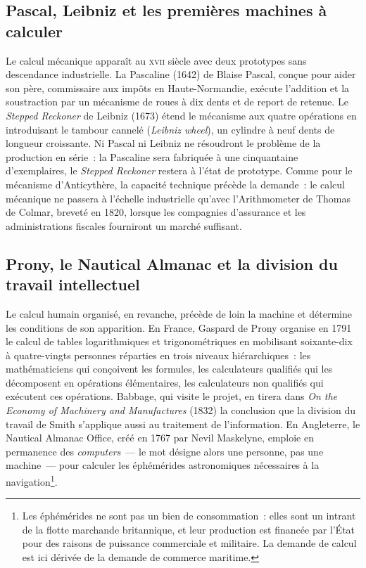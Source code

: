 \subsection{Pascal, Leibniz et les premières machines à calculer}\label{subsec:pascaline}

Le calcul mécanique apparaît au \textsc{xvii}\ieme{} siècle avec deux prototypes sans descendance industrielle. La Pascaline (1642) de Blaise Pascal, conçue pour aider son père, commissaire aux impôts en Haute-Normandie, exécute l'addition et la soustraction par un mécanisme de roues à dix dents et de report de retenue. Le \emph{Stepped Reckoner} de Leibniz (1673) étend le mécanisme aux quatre opérations en introduisant le tambour cannelé (\emph{Leibniz wheel}), un cylindre à neuf dents de longueur croissante. Ni Pascal ni Leibniz ne résoudront le problème de la production en série~: la Pascaline sera fabriquée à une cinquantaine d'exemplaires, le \emph{Stepped Reckoner} restera à l'état de prototype. %
Comme pour le mécanisme d'Anticythère, la capacité technique précède la demande~: le calcul mécanique ne passera à l'échelle industrielle qu'avec l'Arithmometer de Thomas de Colmar, breveté en 1820, lorsque les compagnies d'assurance et les administrations fiscales fourniront un marché suffisant.

\subsection{Prony, le Nautical Almanac et la division du travail intellectuel}\label{subsec:prony}

Le calcul humain organisé, en revanche, précède de loin la machine et détermine les conditions de son apparition. En France, Gaspard de Prony organise en 1791 le calcul de tables logarithmiques et trigonométriques en mobilisant soixante-dix à quatre-vingts personnes réparties en trois niveaux hiérarchiques~: les mathématiciens qui conçoivent les formules, les calculateurs qualifiés qui les décomposent en opérations élémentaires, les calculateurs non qualifiés qui exécutent ces opérations. %
Babbage, qui visite le projet, en tirera dans \emph{On the Economy of Machinery and Manufactures} (1832) la conclusion que la division du travail de Smith s'applique aussi au traitement de l'information. En Angleterre, le Nautical Almanac Office, créé en 1767 par Nevil Maskelyne, emploie en permanence des \emph{computers}~--- le mot désigne alors une personne, pas une machine~--- pour calculer les éphémérides astronomiques nécessaires à la navigation\footnote{Les éphémérides ne sont pas un bien de consommation~: elles sont un intrant de la flotte marchande britannique, et leur production est financée par l'État pour des raisons de puissance commerciale et militaire. La demande de calcul est ici dérivée de la demande de commerce maritime.}.

